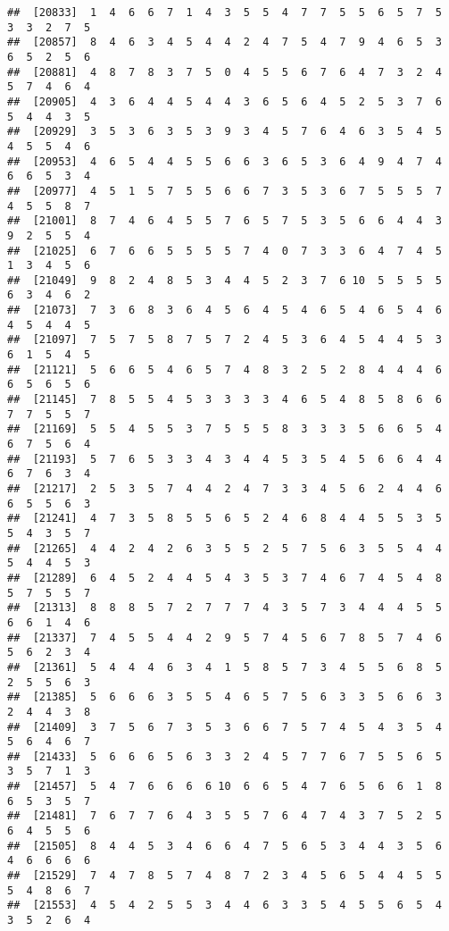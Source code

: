 \documentclass[
]{book}
\begin{document}
\begin{verbatim}
##  [20833]  1  4  6  6  7  1  4  3  5  5  4  7  7  5  5  6  5  7  5  3  3  2  7  5
##  [20857]  8  4  6  3  4  5  4  4  2  4  7  5  4  7  9  4  6  5  3  6  5  2  5  6
##  [20881]  4  8  7  8  3  7  5  0  4  5  5  6  7  6  4  7  3  2  4  5  7  4  6  4
##  [20905]  4  3  6  4  4  5  4  4  3  6  5  6  4  5  2  5  3  7  6  5  4  4  3  5
##  [20929]  3  5  3  6  3  5  3  9  3  4  5  7  6  4  6  3  5  4  5  4  5  5  4  6
##  [20953]  4  6  5  4  4  5  5  6  6  3  6  5  3  6  4  9  4  7  4  6  6  5  3  4
##  [20977]  4  5  1  5  7  5  5  6  6  7  3  5  3  6  7  5  5  5  7  4  5  5  8  7
##  [21001]  8  7  4  6  4  5  5  7  6  5  7  5  3  5  6  6  4  4  3  9  2  5  5  4
##  [21025]  6  7  6  6  5  5  5  5  7  4  0  7  3  3  6  4  7  4  5  1  3  4  5  6
##  [21049]  9  8  2  4  8  5  3  4  4  5  2  3  7  6 10  5  5  5  5  6  3  4  6  2
##  [21073]  7  3  6  8  3  6  4  5  6  4  5  4  6  5  4  6  5  4  6  4  5  4  4  5
##  [21097]  7  5  7  5  8  7  5  7  2  4  5  3  6  4  5  4  4  5  3  6  1  5  4  5
##  [21121]  5  6  6  5  4  6  5  7  4  8  3  2  5  2  8  4  4  4  6  6  5  6  5  6
##  [21145]  7  8  5  5  4  5  3  3  3  3  4  6  5  4  8  5  8  6  6  7  7  5  5  7
##  [21169]  5  5  4  5  5  3  7  5  5  5  8  3  3  3  5  6  6  5  4  6  7  5  6  4
##  [21193]  5  7  6  5  3  3  4  3  4  4  5  3  5  4  5  6  6  4  4  6  7  6  3  4
##  [21217]  2  5  3  5  7  4  4  2  4  7  3  3  4  5  6  2  4  4  6  6  5  5  6  3
##  [21241]  4  7  3  5  8  5  5  6  5  2  4  6  8  4  4  5  5  3  5  5  4  3  5  7
##  [21265]  4  4  2  4  2  6  3  5  5  2  5  7  5  6  3  5  5  4  4  5  4  4  5  3
##  [21289]  6  4  5  2  4  4  5  4  3  5  3  7  4  6  7  4  5  4  8  5  7  5  5  7
##  [21313]  8  8  8  5  7  2  7  7  7  4  3  5  7  3  4  4  4  5  5  6  6  1  4  6
##  [21337]  7  4  5  5  4  4  2  9  5  7  4  5  6  7  8  5  7  4  6  5  6  2  3  4
##  [21361]  5  4  4  4  6  3  4  1  5  8  5  7  3  4  5  5  6  8  5  2  5  5  6  3
##  [21385]  5  6  6  6  3  5  5  4  6  5  7  5  6  3  3  5  6  6  3  2  4  4  3  8
##  [21409]  3  7  5  6  7  3  5  3  6  6  7  5  7  4  5  4  3  5  4  5  6  4  6  7
##  [21433]  5  6  6  6  5  6  3  3  2  4  5  7  7  6  7  5  5  6  5  3  5  7  1  3
##  [21457]  5  4  7  6  6  6  6 10  6  6  5  4  7  6  5  6  6  1  8  6  5  3  5  7
##  [21481]  7  6  7  7  6  4  3  5  5  7  6  4  7  4  3  7  5  2  5  6  4  5  5  6
##  [21505]  8  4  4  5  3  4  6  6  4  7  5  6  5  3  4  4  3  5  6  4  6  6  6  6
##  [21529]  7  4  7  8  5  7  4  8  7  2  3  4  5  6  5  4  4  5  5  5  4  8  6  7
##  [21553]  4  5  4  2  5  5  3  4  4  6  3  3  5  4  5  5  6  5  4  3  5  2  6  4

\end{verbatim}
\end{document}
